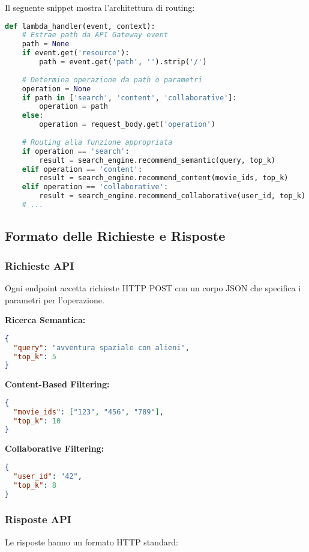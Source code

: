 \documentclass[11pt,a4paper]{article}
\begin{document}
Il seguente snippet mostra l'architettura di routing:

\begin{lstlisting}[language=Python]
def lambda_handler(event, context):
    # Estrae path da API Gateway event
    path = None
    if event.get('resource'):
        path = event.get('path', '').strip('/')
    
    # Determina operazione da path o parametri
    operation = None
    if path in ['search', 'content', 'collaborative']:
        operation = path
    else:
        operation = request_body.get('operation')
    
    # Routing alla funzione appropriata
    if operation == 'search':
        result = search_engine.recommend_semantic(query, top_k)
    elif operation == 'content':
        result = search_engine.recommend_content(movie_ids, top_k)
    elif operation == 'collaborative':
        result = search_engine.recommend_collaborative(user_id, top_k)
    # ...
\end{lstlisting}

\subsection{Formato delle Richieste e Risposte}

\subsubsection{Richieste API}
Ogni endpoint accetta richieste HTTP POST con un corpo JSON che specifica i parametri per l'operazione.

\textbf{Ricerca Semantica:}
\begin{lstlisting}[language=json]
{
  "query": "avventura spaziale con alieni",
  "top_k": 5
}
\end{lstlisting}

\textbf{Content-Based Filtering:}
\begin{lstlisting}[language=json]
{
  "movie_ids": ["123", "456", "789"],
  "top_k": 10
}
\end{lstlisting}

\textbf{Collaborative Filtering:}
\begin{lstlisting}[language=json]
{
  "user_id": "42",
  "top_k": 8
}
\end{lstlisting}

\subsubsection{Risposte API}
Le risposte hanno un formato HTTP standard:
\end{document}
